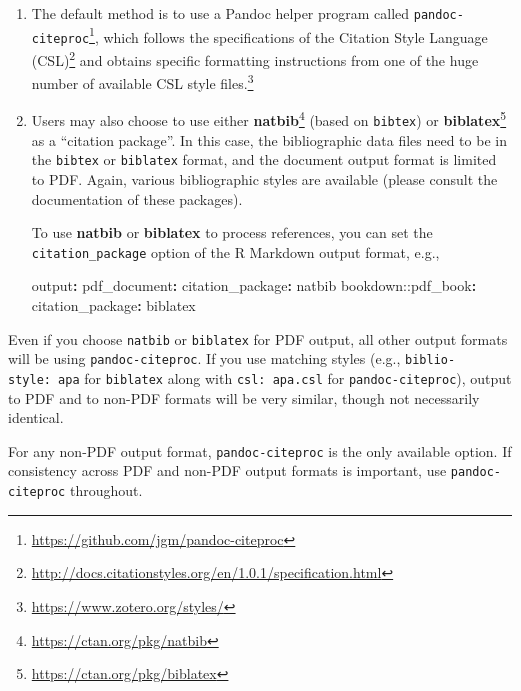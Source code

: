 \documentclass[
  12pt,
]{krantz}
\newenvironment{Shaded}{\begin{snugshade}}{\end{snugshade}}
\newcommand{\AttributeTok}[1]{\textcolor[rgb]{0.77,0.63,0.00}{#1}}
\newcommand{\FunctionTok}[1]{\textcolor[rgb]{0.00,0.00,0.00}{#1}}
\newcommand{\KeywordTok}[1]{\textcolor[rgb]{0.13,0.29,0.53}{\textbf{#1}}}
\renewcommand{\href}[2]{#2\footnote{\url{#1}}}
\theoremstyle{definition}
\theoremstyle{definition}
\theoremstyle{definition}
\theoremstyle{definition}
\theoremstyle{remark}
\begin{document}
\begin{enumerate}
\def\labelenumi{\arabic{enumi}.}
\item
  The default method is to use a Pandoc helper program called \href{https://github.com/jgm/pandoc-citeproc}{\texttt{pandoc-citeproc}}, which follows the specifications of the \href{http://docs.citationstyles.org/en/1.0.1/specification.html}{Citation Style Language (CSL)} and obtains specific formatting instructions from one of the huge number of available \href{https://www.zotero.org/styles/}{CSL style files.}
\item
  Users may also choose to use either \href{https://ctan.org/pkg/natbib}{\textbf{natbib}} (based on \texttt{bibtex}) or \href{https://ctan.org/pkg/biblatex}{\textbf{biblatex}} as a ``citation package''. In this case, the bibliographic data files need to be in the \texttt{bibtex} or \texttt{biblatex} format, and the document output format is limited to PDF. Again, various bibliographic styles are available (please consult the documentation of these packages).

  To use \textbf{natbib} or \textbf{biblatex} to process references, you can set the \texttt{citation\_package} option of the R Markdown output format, e.g.,

\begin{Shaded}
\begin{Highlighting}[]
\FunctionTok{output}\KeywordTok{:}
\AttributeTok{  }\FunctionTok{pdf\_document}\KeywordTok{:}
\AttributeTok{    }\FunctionTok{citation\_package}\KeywordTok{:}\AttributeTok{ natbib}
\AttributeTok{  bookdown:}\FunctionTok{:pdf\_book}\KeywordTok{:}
\AttributeTok{    }\FunctionTok{citation\_package}\KeywordTok{:}\AttributeTok{ biblatex}
\end{Highlighting}
\end{Shaded}
\end{enumerate}

Even if you choose \texttt{natbib} or \texttt{biblatex} for PDF output, all other output formats will be using \texttt{pandoc-citeproc}. If you use matching styles (e.g., \texttt{biblio-style:\ apa} for \texttt{biblatex} along with \texttt{csl:\ apa.csl} for \texttt{pandoc-citeproc}), output to PDF and to non-PDF formats will be very similar, though not necessarily identical.

For any non-PDF output format, \texttt{pandoc-citeproc} is the only available option. If consistency across PDF and non-PDF output
formats is important, use \texttt{pandoc-citeproc} throughout.
\end{document}
